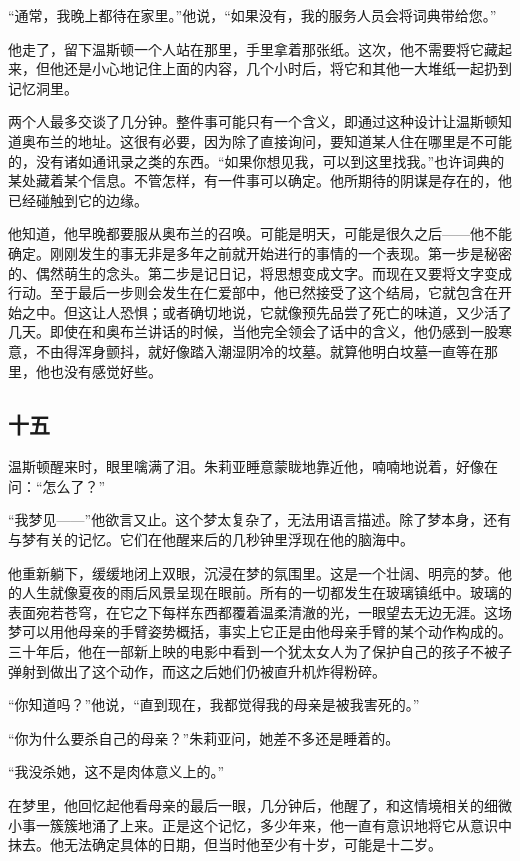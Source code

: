 ``通常，我晚上都待在家里。''他说，``如果没有，我的服务人员会将词典带给您。''

他走了，留下温斯顿一个人站在那里，手里拿着那张纸。这次，他不需要将它藏起来，但他还是小心地记住上面的内容，几个小时后，将它和其他一大堆纸一起扔到记忆洞里。

两个人最多交谈了几分钟。整件事可能只有一个含义，即通过这种设计让温斯顿知道奥布兰的地址。这很有必要，因为除了直接询问，要知道某人住在哪里是不可能的，没有诸如通讯录之类的东西。``如果你想见我，可以到这里找我。''也许词典的某处藏着某个信息。不管怎样，有一件事可以确定。他所期待的阴谋是存在的，他已经碰触到它的边缘。

他知道，他早晚都要服从奥布兰的召唤。可能是明天，可能是很久之后------他不能确定。刚刚发生的事无非是多年之前就开始进行的事情的一个表现。第一步是秘密的、偶然萌生的念头。第二步是记日记，将思想变成文字。而现在又要将文字变成行动。至于最后一步则会发生在仁爱部中，他已然接受了这个结局，它就包含在开始之中。但这让人恐惧；或者确切地说，它就像预先品尝了死亡的味道，又少活了几天。即使在和奥布兰讲话的时候，当他完全领会了话中的含义，他仍感到一股寒意，不由得浑身颤抖，就好像踏入潮湿阴冷的坟墓。就算他明白坟墓一直等在那里，他也没有感觉好些。

\subsection{十五}\label{ux5341ux4e94}

温斯顿醒来时，眼里噙满了泪。朱莉亚睡意蒙眬地靠近他，喃喃地说着，好像在问：``怎么了？''

``我梦见------''他欲言又止。这个梦太复杂了，无法用语言描述。除了梦本身，还有与梦有关的记忆。它们在他醒来后的几秒钟里浮现在他的脑海中。

他重新躺下，缓缓地闭上双眼，沉浸在梦的氛围里。这是一个壮阔、明亮的梦。他的人生就像夏夜的雨后风景呈现在眼前。所有的一切都发生在玻璃镇纸中。玻璃的表面宛若苍穹，在它之下每样东西都覆着温柔清澈的光，一眼望去无边无涯。这场梦可以用他母亲的手臂姿势概括，事实上它正是由他母亲手臂的某个动作构成的。三十年后，他在一部新上映的电影中看到一个犹太女人为了保护自己的孩子不被子弹射到做出了这个动作，而这之后她们仍被直升机炸得粉碎。

``你知道吗？''他说，``直到现在，我都觉得我的母亲是被我害死的。''

``你为什么要杀自己的母亲？''朱莉亚问，她差不多还是睡着的。

``我没杀她，这不是肉体意义上的。''

在梦里，他回忆起他看母亲的最后一眼，几分钟后，他醒了，和这情境相关的细微小事一簇簇地涌了上来。正是这个记忆，多少年来，他一直有意识地将它从意识中抹去。他无法确定具体的日期，但当时他至少有十岁，可能是十二岁。

